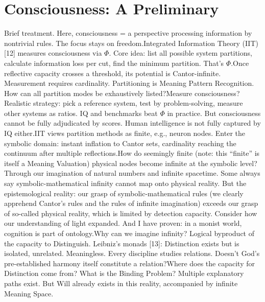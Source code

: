 \documentclass[11pt]{article}
\renewcommand{\\}[1][\mynewlineskip]{\oldnewline[#1]}
\begin{document}
\section{Consciousness: A Preliminary}
Brief treatment. Here, consciousness = a perspective processing information by nontrivial rules. The focus stays on freedom.\\
Integrated Information Theory (IIT) [12] measures consciousness via $\Phi$. Core idea: list all possible system partitions, calculate information loss per cut, find the minimum partition. That's $\Phi$.\\
Once reflective capacity crosses a threshold, its potential is Cantor-infinite. Measurement requires cardinality. Partitioning is Meaning Pattern Recognition. How can all partition modes be exhaustively listed?\\
Measure consciousness? Realistic strategy: pick a reference system, test by problem-solving, measure other systems as ratios. IQ and benchmarks beat $\Phi$ in practice. But consciousness cannot be fully adjudicated by scores. Human intelligence is not fully captured by IQ either.\\
IIT views partition methods as finite, e.g., neuron nodes. Enter the symbolic domain: instant inflation to Cantor sets, cardinality reaching the continuum after multiple reflections.\\
How do seemingly finite (note: this ``finite'' is itself a Meaning Valuation) physical nodes become infinite at the symbolic level? Through our imagination of natural numbers and infinite spacetime. Some always say symbolic-mathematical infinity cannot map onto physical reality. But the epistemological reality: our grasp of symbolic-mathematical rules (we clearly apprehend Cantor's rules and the rules of infinite imagination) exceeds our grasp of so-called physical reality, which is limited by detection capacity. Consider how our understanding of light expanded. And I have proven: in a monist world, cognition is part of ontology.\\
Why can we imagine infinity? Logical byproduct of the capacity to Distinguish. Leibniz's monads [13]: Distinction exists but is isolated, unrelated. Meaningless. Every discipline studies relations. Doesn't God's pre-established harmony itself constitute a relation?\\
Where does the capacity for Distinction come from? What is the Binding Problem? Multiple explanatory paths exist. But Will already exists in this reality, accompanied by infinite Meaning Space.
\end{document}
